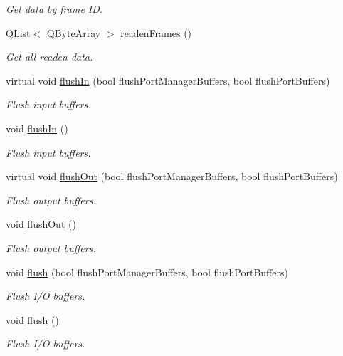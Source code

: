\begin{DoxyCompactItemize}
\begin{DoxyCompactList}\small\item\em Get data by frame I\-D. \end{DoxyCompactList}\item 
Q\-List$<$ Q\-Byte\-Array $>$ \hyperlink{classmdt_port_manager_addd5dcae9644cea42a9871205af41796}{readen\-Frames} ()
\begin{DoxyCompactList}\small\item\em Get all readen data. \end{DoxyCompactList}\item 
virtual void \hyperlink{classmdt_port_manager_ac0844a5cd4043a95a479d458ac7ce590}{flush\-In} (bool flush\-Port\-Manager\-Buffers, bool flush\-Port\-Buffers)
\begin{DoxyCompactList}\small\item\em Flush input buffers. \end{DoxyCompactList}\item 
void \hyperlink{classmdt_port_manager_a4c44ce6ec40c4afc6be441c10d7ee827}{flush\-In} ()
\begin{DoxyCompactList}\small\item\em Flush input buffers. \end{DoxyCompactList}\item 
virtual void \hyperlink{classmdt_port_manager_a3f0c2722a41c49de2bea9013bccd049c}{flush\-Out} (bool flush\-Port\-Manager\-Buffers, bool flush\-Port\-Buffers)
\begin{DoxyCompactList}\small\item\em Flush output buffers. \end{DoxyCompactList}\item 
void \hyperlink{classmdt_port_manager_ab34018a9653a5af784fa7da06a9e50d3}{flush\-Out} ()
\begin{DoxyCompactList}\small\item\em Flush output buffers. \end{DoxyCompactList}\item 
void \hyperlink{classmdt_port_manager_a97b91e7c1641836eb6afb47fd244a18e}{flush} (bool flush\-Port\-Manager\-Buffers, bool flush\-Port\-Buffers)
\begin{DoxyCompactList}\small\item\em Flush I/\-O buffers. \end{DoxyCompactList}\item 
void \hyperlink{classmdt_port_manager_a3eab774008d7530ae341ce9c38265d65}{flush} ()
\begin{DoxyCompactList}\small\item\em Flush I/\-O buffers. \end{DoxyCompactList}\item 

\end{DoxyCompactItemize}
